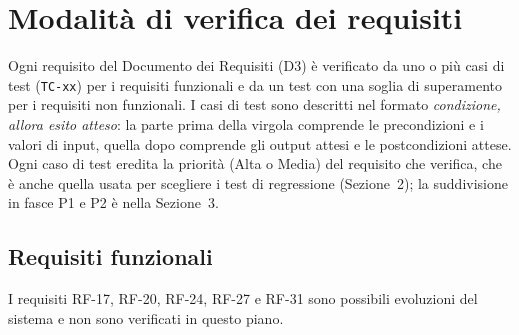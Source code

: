 \section{Modalità di verifica dei requisiti}

Ogni requisito del Documento dei Requisiti (D3) è verificato da uno o più casi di test (\texttt{TC-xx}) per i requisiti funzionali e da un test con una soglia di superamento per i requisiti non funzionali. I casi di test sono descritti nel formato \emph{condizione, allora esito atteso}: la parte prima della virgola comprende le precondizioni e i valori di input, quella dopo comprende gli output attesi e le postcondizioni attese. Ogni caso di test eredita la priorità (Alta o Media) del requisito che verifica, che è anche quella usata per scegliere i test di regressione (Sezione~2); la suddivisione in fasce P1 e P2 è nella Sezione~3.

\subsection{Requisiti funzionali}

I requisiti RF-17, RF-20, RF-24, RF-27 e RF-31 sono possibili evoluzioni del sistema e non sono verificati in questo piano.

